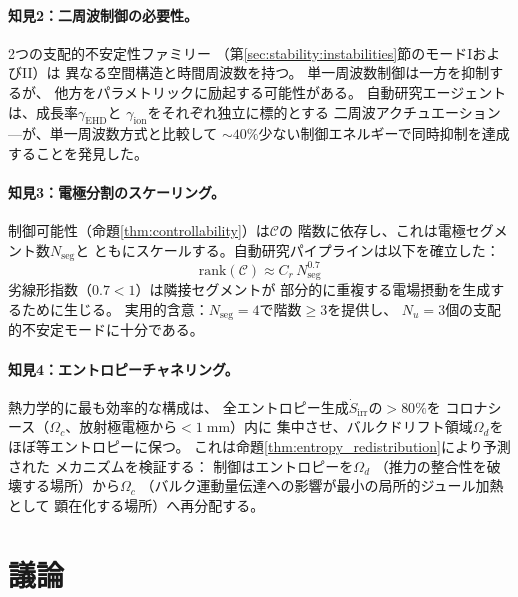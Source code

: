 \documentclass[12pt,twocolumn]{ltjsarticle}
\newcommand{\Sdot}{\dot{S}_{\mathrm{irr}}}
\begin{document}
\paragraph{知見2：二周波制御の必要性。}
2つの支配的不安定性ファミリー
（第\ref{sec:stability:instabilities}節のモードIおよびII）は
異なる空間構造と時間周波数を持つ。
単一周波数制御は一方を抑制するが、
他方をパラメトリックに励起する可能性がある。
自動研究エージェントは、成長率$\gamma_{\mathrm{EHD}}$と
$\gamma_{\mathrm{ion}}$をそれぞれ独立に標的とする
二周波アクチュエーション---が、単一周波数方式と比較して
$\sim 40\%$少ない制御エネルギーで同時抑制を達成することを発見した。

\paragraph{知見3：電極分割のスケーリング。}
制御可能性（命題\ref{thm:controllability}）は$\mathcal{C}$の
階数に依存し、これは電極セグメント数$N_{\mathrm{seg}}$と
ともにスケールする。自動研究パイプラインは以下を確立した：
\begin{equation}
  \mathrm{rank}(\mathcal{C})
  \approx C_r\,N_{\mathrm{seg}}^{0.7}
  \label{eq:rank_scaling}
\end{equation}
劣線形指数（$0.7 < 1$）は隣接セグメントが
部分的に重複する電場摂動を生成するために生じる。
実用的含意：$N_{\mathrm{seg}} = 4$で階数$\geq 3$を提供し、
$N_u = 3$個の支配的不安定モードに十分である。

\paragraph{知見4：エントロピーチャネリング。}
熱力学的に最も効率的な構成は、
全エントロピー生成$\Sdot$の$> 80\%$を
コロナシース（$\Omega_c$、放射極電極から$< 1\;\mathrm{mm}$）内に
集中させ、バルクドリフト領域$\Omega_d$をほぼ等エントロピーに保つ。
これは命題\ref{thm:entropy_redistribution}により予測された
メカニズムを検証する：
制御はエントロピーを$\Omega_d$
（推力の整合性を破壊する場所）から$\Omega_c$
（バルク運動量伝達への影響が最小の局所的ジュール加熱として
顕在化する場所）へ再分配する。

\section{議論}
\label{sec:discussion}
\end{document}
